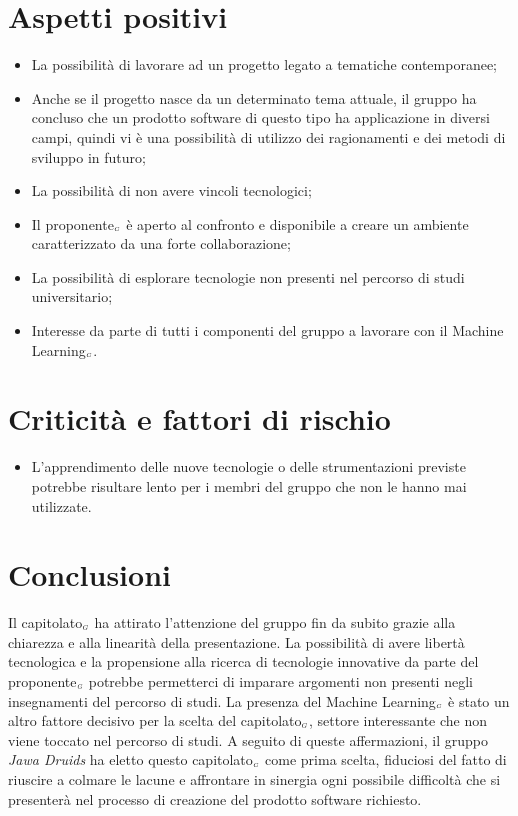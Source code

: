 \section{Aspetti positivi} \label{C3AspettiPositivi}
\begin{itemize}
	\item La possibilità di lavorare ad un progetto legato a tematiche contemporanee;
	\item Anche se il progetto nasce da un determinato tema attuale, il gruppo ha concluso che un prodotto software di questo tipo ha applicazione in diversi campi, quindi vi è una possibilità di utilizzo dei ragionamenti e dei metodi di sviluppo in futuro;
	\item La possibilità di non avere vincoli tecnologici;
	\item Il proponente$_{\scaleto{G}{3pt}}$ è aperto al confronto e disponibile a creare un ambiente caratterizzato da una forte collaborazione;
	\item La possibilità di esplorare tecnologie non presenti nel percorso di studi universitario;
	\item Interesse da parte di tutti i componenti del gruppo a lavorare con il Machine Learning$_{\scaleto{G}{3pt}}$.
\end{itemize}
\section{Criticità e fattori di rischio} \label{C3CriticitàEFattoriDiRischio}
\begin{itemize}
	\item L'apprendimento delle nuove tecnologie o delle strumentazioni previste potrebbe risultare lento per i membri del gruppo che non le hanno mai utilizzate.
\end{itemize}
\section{Conclusioni} \label{C3Conclusioni}
Il capitolato$_{\scaleto{G}{3pt}}$ ha attirato l'attenzione del gruppo fin da subito grazie alla chiarezza e alla linearità della presentazione. La possibilità di avere libertà tecnologica e la propensione alla ricerca di tecnologie innovative da parte del proponente$_{\scaleto{G}{3pt}}$ potrebbe permetterci di imparare argomenti non presenti negli insegnamenti del percorso di studi. La presenza del Machine Learning$_{\scaleto{G}{3pt}}$ è stato un altro fattore decisivo per la scelta del capitolato$_{\scaleto{G}{3pt}}$, settore interessante che non viene toccato nel percorso di studi. A seguito di queste affermazioni, il gruppo \textit{Jawa Druids} ha eletto questo capitolato$_{\scaleto{G}{3pt}}$ come prima scelta, fiduciosi del fatto di riuscire a colmare le lacune e affrontare in sinergia ogni possibile difficoltà che si presenterà nel processo di creazione del prodotto software richiesto.